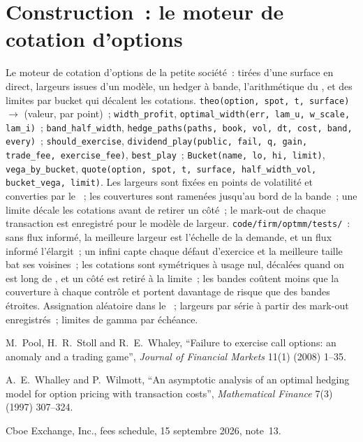 \section{Construction~: le moteur de cotation d'options}\label{bld:dv:options-market-making-in-practice:optmm}

\begin{build}
 Le moteur de cotation d'options de la petite société~:  tirées d'une surface en direct, largeurs issues d'un modèle, un hedger à bande, l'arithmétique du ,
et des limites par bucket qui décalent les cotations.
 \texttt{theo(option, spot, t, surface)} $\to$ (valeur,  par point)~; \texttt{width\_profit}, \texttt{optimal\_width(err, lam\_u, w\_scale,
lam\_i)}~; \texttt{band\_half\_width}, \texttt{hedge\_paths(paths, book, vol, dt, cost, band, every)}~; \texttt{should\_exercise}, \texttt{dividend\_play(public,
fail, q, gain, trade\_fee, exercise\_fee)}, \texttt{best\_play}~; \texttt{Bucket(name, lo, hi, limit)}, \texttt{vega\_by\_bucket}, \texttt{quote(option, spot, t,
surface, half\_width\_vol, bucket\_vega, limit)}. 
Les largeurs sont fixées en points de volatilité et converties par le ~; les couvertures sont ramenées jusqu'au bord de la bande~; une limite décale les cotations avant de retirer un côté~; le mark-out de chaque
transaction est enregistré pour le modèle de largeur.
 \texttt{code/firm/optmm/tests/}~: sans flux informé, la meilleure largeur est l'échelle de la demande, et un flux informé l'élargit~; un  infini
capte chaque défaut d'exercice et la meilleure taille bat ses voisines~; les cotations sont symétriques à usage nul, décalées quand on est long de , et un côté est
retiré à la limite~; les bandes coûtent moins que la couverture à chaque contrôle et portent davantage de risque que des bandes étroites.
 Assignation aléatoire dans le ~; largeurs par série à partir des mark-out enregistrés~; limites de gamma par échéance.
\end{build}

\begin{omsources}
\item M.~Pool, H.~R.~Stoll and R.~E.~Whaley, ``Failure to exercise call options: an anomaly and a trading game'', \emph{Journal of Financial Markets} 11(1)
(2008) 1--35.
\item A.~E.~Whalley and P.~Wilmott, ``An asymptotic analysis of an optimal hedging model for option pricing with transaction costs'', \emph{Mathematical Finance}
7(3) (1997) 307--324.
\item Cboe Exchange, Inc., fees schedule, 15 septembre 2026, note~13.
\end{omsources}

